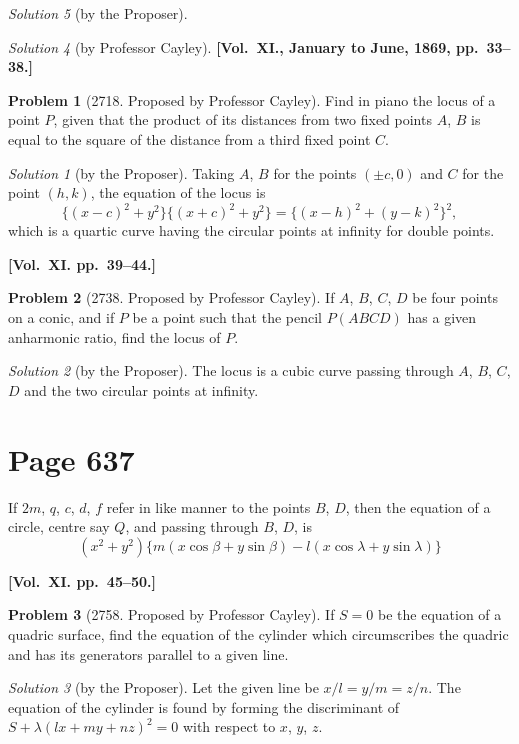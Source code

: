 \documentclass[12pt,a4paper]{article}
\theoremstyle{plain}
\theoremstyle{definition}
\newtheorem{problem}{Problem}
\theoremstyle{remark}
\newtheorem*{solution}{Solution}
\begin{document}
\begin{solution}[by the Proposer]
\begin{solution}[by Professor Cayley]
\medskip\noindent\textbf{[Vol.~XI., January to June, 1869, pp.~33--38.]}

\begin{problem}[2718. Proposed by Professor Cayley]
Find in piano the locus of a point $P$, given that the product of its distances from two fixed points $A$, $B$ is equal to the square of the distance from a third fixed point $C$.
\end{problem}

\begin{solution}[by the Proposer]
Taking $A$, $B$ for the points $(\pm c, 0)$ and $C$ for the point $(h, k)$, the equation of the locus is
\[
\{(x - c)^2 + y^2\}\{(x + c)^2 + y^2\} = \{(x - h)^2 + (y - k)^2\}^2,
\]
which is a quartic curve having the circular points at infinity for double points.
\end{solution}

\medskip\noindent\textbf{[Vol.~XI. pp.~39--44.]}

\begin{problem}[2738. Proposed by Professor Cayley]
If $A$, $B$, $C$, $D$ be four points on a conic, and if $P$ be a point such that the pencil $P(ABCD)$ has a given anharmonic ratio, find the locus of $P$.
\end{problem}

\begin{solution}[by the Proposer]
The locus is a cubic curve passing through $A$, $B$, $C$, $D$ and the two circular points at infinity.
\end{solution}

\section*{Page 637}
\setcounter{page}{637}

If $2m$, $q$, $c$, $d$, $f$ refer in like manner to the points $B$, $D$, then the equation of a circle, centre say $Q$, and passing through $B$, $D$, is
\[
(x^2 + y^2)\{m(x\cos\beta + y\sin\beta) - l(x\cos\lambda + y\sin\lambda)\}
\]

\medskip\noindent\textbf{[Vol.~XI. pp.~45--50.]}

\begin{problem}[2758. Proposed by Professor Cayley]
If $S = 0$ be the equation of a quadric surface, find the equation of the cylinder which circumscribes the quadric and has its generators parallel to a given line.
\end{problem}

\begin{solution}[by the Proposer]
Let the given line be $x/l = y/m = z/n$. The equation of the cylinder is found by forming the discriminant of $S + \lambda(lx + my + nz)^2 = 0$ with respect to $x$, $y$, $z$.
\end{solution}


\end{solution}
\end{solution}
\end{document}
